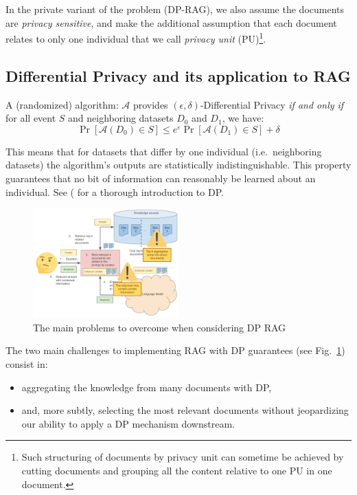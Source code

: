\documentclass[conference]{IEEEtran}
\begin{document}
In the private variant of the problem (DP-RAG), we also assume the
documents are \emph{privacy sensitive}, and make the additional
assumption that each document relates to only one individual that we
call \emph{privacy unit} (PU)\footnote{Such structuring of documents by
  privacy unit can sometime be achieved by cutting documents and
  grouping all the content relative to one PU in one document.}.

\subsection{Differential Privacy and its application to
RAG}\label{differential-privacy-and-its-application-to-rag}

A (randomized) algorithm: \(\mathcal {A}\) provides
\((\epsilon,\delta)\)-Differential Privacy \emph{if and only if} for all
event \(S\) and neighboring datasets \(D_0\) and \(D_1\), we have:
\[\Pr[{\mathcal {A}}(D_{0})\in S]\leq e^{\varepsilon }\Pr[{\mathcal {A}}(D_{1})\in S]+\delta\]

This means that for datasets that differ by one individual
(i.e.~neighboring datasets) the algorithm's outputs are statistically
indistinguishable. This property guarantees that no bit of information
can reasonably be learned about an individual. See (\cite{ref-dwork2014algorithmic} for a thorough introduction to DP.

\begin{figure}
\centering
\includegraphics[width=0.5\textwidth]{figures/noDP-RAG-privacy.pdf}
\caption{The main problems to overcome when considering DP RAG}
\label{fig:ragpriv}
\end{figure}

The two main challenges to implementing RAG with DP guarantees (see
Fig.~\ref{fig:ragpriv}) consist in:

\begin{itemize}

\item
  aggregating the knowledge from many documents with DP,
\item
  and, more subtly, selecting the most relevant documents without
  jeopardizing our ability to apply a DP mechanism downstream.
\end{itemize}
\end{document}
